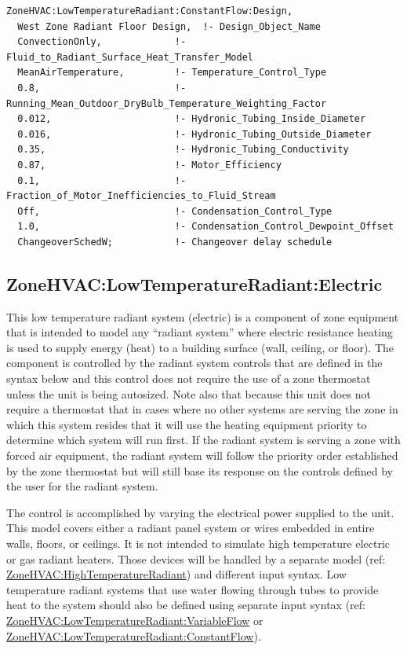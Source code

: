 \begin{lstlisting}
ZoneHVAC:LowTemperatureRadiant:ConstantFlow:Design,
  West Zone Radiant Floor Design,  !- Design_Object_Name
  ConvectionOnly,             !- Fluid_to_Radiant_Surface_Heat_Transfer_Model
  MeanAirTemperature,         !- Temperature_Control_Type
  0.8,                        !- Running_Mean_Outdoor_DryBulb_Temperature_Weighting_Factor
  0.012,                      !- Hydronic_Tubing_Inside_Diameter
  0.016,                      !- Hydronic_Tubing_Outside_Diameter
  0.35,                       !- Hydronic_Tubing_Conductivity
  0.87,                       !- Motor_Efficiency
  0.1,                        !- Fraction_of_Motor_Inefficiencies_to_Fluid_Stream
  Off,                        !- Condensation_Control_Type
  1.0,                        !- Condensation_Control_Dewpoint_Offset
  ChangeoverSchedW;           !- Changeover delay schedule
\end{lstlisting}


\subsection{ZoneHVAC:LowTemperatureRadiant:Electric}\label{zonehvaclowtemperatureradiantelectric}

This low temperature radiant system (electric) is a component of zone equipment that is intended to model any ``radiant system'' where electric resistance heating is used to supply energy (heat) to a building surface (wall, ceiling, or floor). The component is controlled by the radiant system controls that are defined in the syntax below and this control does not require the use of a zone thermostat unless the unit is being autosized. Note also that because this unit does not require a thermostat that in cases where no other systems are serving the zone in which this system resides that it will use the heating equipment priority to determine which system will run first. If the radiant system is serving a zone with forced air equipment, the radiant system will follow the priority order established by the zone thermostat but will still base its response on the controls defined by the user for the radiant system.

The control is accomplished by varying the electrical power supplied to the unit. This model covers either a radiant panel system or wires embedded in entire walls, floors, or ceilings. It is not intended to simulate high temperature electric or gas radiant heaters. Those devices will be handled by a separate model (ref: \hyperref[zonehvachightemperatureradiant]{ZoneHVAC:HighTemperatureRadiant}) and different input syntax. Low temperature radiant systems that use water flowing through tubes to provide heat to the system should also be defined using separate input syntax (ref: \hyperref[zonehvaclowtemperatureradiantvariableflow]{ZoneHVAC:LowTemperatureRadiant:VariableFlow} or \hyperref[zonehvaclowtemperatureradiantconstantflow]{ZoneHVAC:LowTemperatureRadiant:ConstantFlow}).

